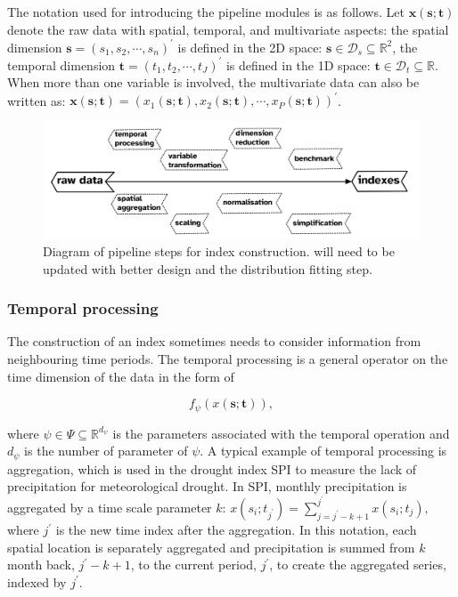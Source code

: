 \documentclass[
]{interact}
\begin{document}
The notation used for introducing the pipeline modules is as follows.
Let \(\mathbf{x}(\mathbf{s};\mathbf{t})\) denote the raw data with
spatial, temporal, and multivariate aspects: the spatial dimension
\(\mathbf{s} = (s_1, s_2, \cdots, s_n)^\prime\) is defined in the 2D
space: \(\mathbf{s} \in \mathcal{D}_s \subseteq \mathbb{R}^2\), the
temporal dimension \(\mathbf{t} = (t_1, t_2, \cdots, t_J)^\prime\) is
defined in the 1D space:
\(\mathbf{t} \in \mathcal{D}_t \subseteq \mathbb{R}\). When more than
one variable is involved, the multivariate data can also be written as:
\(\mathbf{x}(\mathbf{s}; \mathbf{t}) = (x_1(\mathbf{s}; \mathbf{t}), x_2(\mathbf{s}; \mathbf{t}), \cdots, x_P(\mathbf{s}; \mathbf{t}))^\prime\).

\begin{figure}

{\centering \includegraphics[width=1\textwidth,height=0.9\textheight]{figures/pipeline-steps.png}

}

\caption{\label{fig-pipeline-steps}Diagram of pipeline steps for index
construction. will need to be updated with better design and the
distribution fitting step.}

\end{figure}

\hypertarget{temporal-processing}{%
\subsubsection{Temporal processing}\label{temporal-processing}}

The construction of an index sometimes needs to consider information
from neighbouring time periods. The temporal processing is a general
operator on the time dimension of the data in the form of

\begin{equation}
f_{\mathcal{\psi}}(x(\mathbf{s};\mathbf{t})),
\end{equation}

where \(\psi \in \Psi \subseteq \mathbb{R}^{d_{\psi}}\) is the
parameters associated with the temporal operation and \(d_{\psi}\) is
the number of parameter of \(\psi\). A typical example of temporal
processing is aggregation, which is used in the drought index SPI to
measure the lack of precipitation for meteorological drought. In SPI,
monthly precipitation is aggregated by a time scale parameter \(k\):
\(x(s_i;t_{j^\prime}) = \sum_{j = j^\prime-k+1}^{j^\prime}x(s_i; t_j),\)
where \(j^\prime\) is the new time index after the aggregation. In this
notation, each spatial location is separately aggregated and
precipitation is summed from \(k\) month back, \(j^\prime - k + 1\), to
the current period, \(j^\prime\), to create the aggregated series,
indexed by \(j^\prime\).
\end{document}
